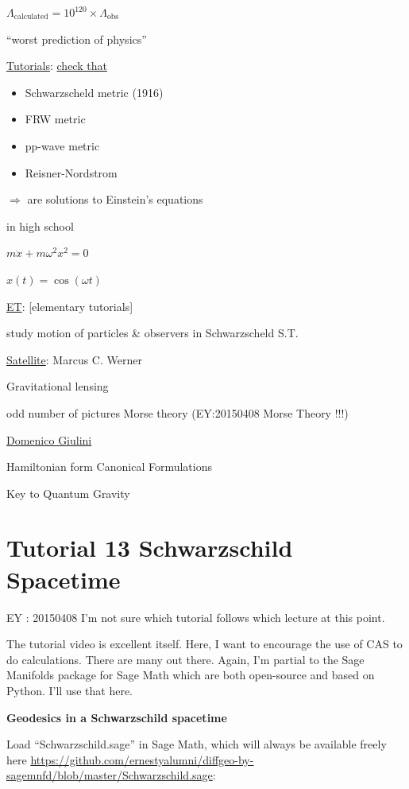\begin{enumerate}
		$\Lambda_{\text{calculated}} = 10^{120} \times \Lambda_{\text{obs}}$
		
		``worst prediction of physics''
		
		\underline{Tutorials}: \underline{check that }
		\begin{itemize}
			\item Schwarzscheld metric (1916)
			\item FRW metric 
			\item pp-wave metric 
			\item Reisner-Nordstrom 
		\end{itemize}
		$\Longrightarrow $ are solutions to Einstein's equations
	\end{enumerate}
	
	in high school 
	
	$m\ddot{x} + m\omega^2 x^2=0$
	
	$x(t) = \cos{(\omega t)}$
	
	\underline{ET}: [elementary tutorials]
	
	study motion of particles \& observers in Schwarzscheld S.T.
	
	\underline{Satellite}: Marcus C. Werner
	
	Gravitational lensing
	
	odd number of pictures Morse theory (EY:20150408 Morse Theory !!!)
	
	\underline{Domenico Giulini}
	
	Hamiltonian form
	Canonical Formulations
	
	Key to Quantum Gravity
	
	
	\section*{Tutorial 13 Schwarzschild Spacetime}
	
	EY : 20150408 I'm not sure which tutorial follows which lecture at this point.
	
	The tutorial video is excellent itself.  Here, I want to encourage the use of CAS to do calculations.  There are many out there.  Again, I'm partial to the Sage Manifolds package for Sage Math which are both open-source and based on Python. I'll use that here.  
	
	 \textbf{Geodesics in a Schwarzschild spacetime}
	
	
	Load ``Schwarzschild.sage'' in Sage Math, which will always be available freely here \url{https://github.com/ernestyalumni/diffgeo-by-sagemnfd/blob/master/Schwarzschild.sage}:
	
